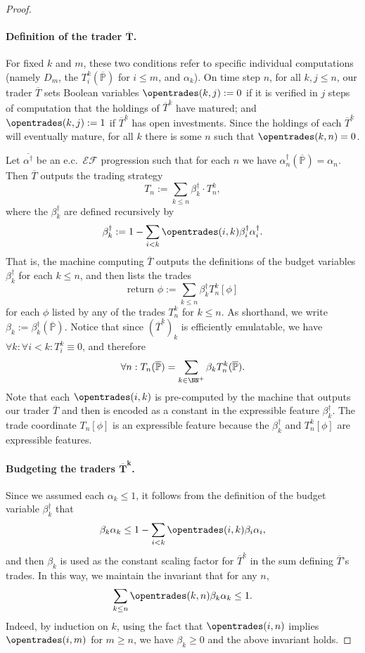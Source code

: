\documentclass[authordate,onecolumn,noenvironments]{miri-tech-article}
\numberwithin{equation}{subsection}
\newcommand{\seq}[1]{{\overline{#1}}}
\newcommand{\ec}[1][\ ]{e.c.#1}
\newcommand{\exfeatures}{\mathcal{E\!F}} %
\newcommand{\trade}{T}%
\newcommand{\Trader}{\seq{\trade}} %
\newcommand{\gens}{\dagger}
\newcommand{\gen}[1]{{#1^\gens}}
\newcommand{\BelState}{\mathbb{P}}
\newcommand{\pt}{\BelState}
\newcommand{\MP}{\seq{\pt}}
\newcommand{\ftn}{(\MP)} %
\newcommand{\dt}{D}
\newcommand{\returntrade}{\textrm{return }}
\begin{document}
\begin{proof}
\paragraph{Definition of the trader $\bm{\Trader}$.}

For fixed $k$ and $m$, these two conditions
refer to specific individual computations (namely  $\dt_m$,  the $\trade^k_i(\MP)$ for $i \leq m$, and $\alpha_k$).
On time step $n$, for all $k,j \leq n$,
our trader  $\Trader$ sets Boolean variables $\opentrades(k,j) :=0$ if it is verified in $j$ steps of computation that  the holdings of $\Trader^k$ have matured; and $\opentrades(k,j) :=1$ if $\Trader^k$ has open investments. 
Since the holdings of each $\Trader^k$ will eventually
mature, for all $k$ there is some $n$ such that $\opentrades(k,n) = 0$. 

Let $\seq{\gen\alpha}$ be an \ec $\exfeatures$ progression such that for each $n$ we have $\gen{\alpha_n} \ftn = \alpha_n$.
Then $\Trader$ outputs the trading strategy 
%
\[ \trade_n := \sum_{k\leq n} \gen{\beta_k} \cdot \trade^k_n,  \]
%
where the $\gen{\beta_k}$ are defined recursively by 
%
\[ \gen{\beta_k} := 1- \sum_{i < k} \opentrades(i,k) \gen{\beta_i} \gen{\alpha_i} .\]
%
That is, the machine computing $\Trader$ outputs the definitions of the budget variables
$\gen{\beta_k}$  
%
for each $k \leq n$, and then lists the trades
%
\[ \returntrade \phi := \sum_{k\leq n} \gen{\beta_k} \trade^k_n[\phi]\]
%
for each $\phi$ listed by any of the trades $\trade^k_n$ for $k \leq n$. 
As shorthand, we write $\beta_k := \gen{\beta_k} \ftn$.  
Notice that since $(\Trader^k)_k$ is efficiently emulatable, we have $\forall k: \forall i<k: \trade^k_i \equiv 0$, and therefore 
%
\[ \forall n: \trade_n \ftn = \sum_{k\in {\NN^+}} \beta_k \trade^k_n \ftn.\]
%
Note that each $\opentrades(i,k)$ is pre-computed 
by the machine that outputs our trader $\Trader$ and then is encoded as a constant in the expressible feature $\gen{\beta_k}$. 
The trade coordinate $\trade_n[\phi]$ is an expressible feature because the $\gen{\beta_k}$ and $\trade^k_n[\phi]$ are expressible features.

\paragraph{Budgeting the traders $\bm{\Trader^k}$.}

Since we assumed each $\alpha_k \leq 1$, it follows from the definition of the budget variable $\gen{\beta_k}$ that 
%
\[ \beta_k \alpha_k  \leq  1- \sum_{i < k} \opentrades(i,k) \beta_i \alpha_i,\]
%
and then $\beta_k$ is used as the constant scaling factor for $\Trader^k$ in the sum defining $\Trader$'s trades. 
In this way, we maintain the invariant that for any $n$, 
%
\[\sum_{k\leq n} \opentrades(k,n) \beta_k \alpha_k \leq 1.\]
%
Indeed, by induction on $k$, using the fact that $\opentrades(i,n)$ implies $\opentrades(i,m)$ for $m\ge n$, we have $\beta_k \geq 0$ and the above invariant holds.


\end{proof}
\end{document}
